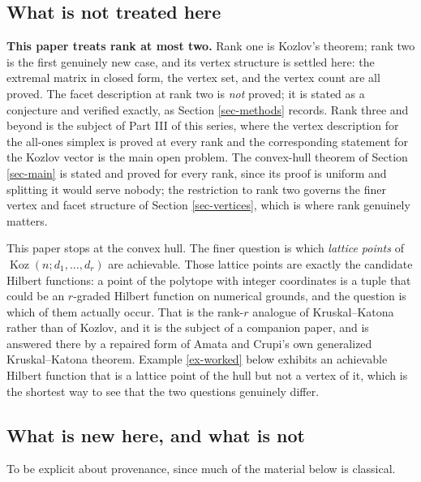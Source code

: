 \documentclass[11pt, a4paper, abstract=yes]{scrartcl}
\theoremstyle{definition}
\theoremstyle{remark}
\theoremstyle{plain}
\newcommand{\Koz}{\operatorname{Koz}}
\begin{document}
\subsection{What is not treated here}
\label{sec-scope}
\textbf{This paper treats rank at most two.} Rank one is Kozlov's theorem; rank two is the first genuinely
new case, and its vertex structure is settled here: the extremal matrix in closed form, the vertex
set, and the vertex count are all proved. The facet description at rank two is \emph{not} proved; it is
stated as a conjecture and verified exactly, as Section \ref{sec-methods} records. Rank three and beyond is the subject of
Part III of this series, where the vertex description for the all-ones simplex is proved at every
rank and the corresponding statement for the Kozlov vector is the main open problem. The convex-hull
theorem of Section \ref{sec-main} is stated and proved for every rank, since its proof is uniform and
splitting it would serve nobody; the restriction to rank two governs the finer vertex and facet
structure of Section \ref{sec-vertices}, which is where rank genuinely matters.


This paper stops at the convex hull. The finer question is which \emph{lattice points} of
\(\Koz(n;d_1,\dots,d_r)\) are achievable. Those lattice points are exactly the candidate Hilbert
functions: a point of the polytope with integer coordinates is a tuple that could be an
\(r\)-graded Hilbert function on numerical grounds, and the question is which of them actually
occur. That is the rank-\(r\) analogue of Kruskal--Katona rather than of Kozlov, and it is the
subject of a companion paper, and is answered there by a repaired form of Amata and
Crupi's own generalized Kruskal--Katona theorem. Example \ref{ex-worked} below exhibits an achievable
Hilbert function that is a lattice point of the hull but not a vertex of it, which is the shortest
way to see that the two questions genuinely differ.
\subsection{What is new here, and what is not}
\label{sec:org24a1c3b}

To be explicit about provenance, since much of the material below is classical.
\end{document}
